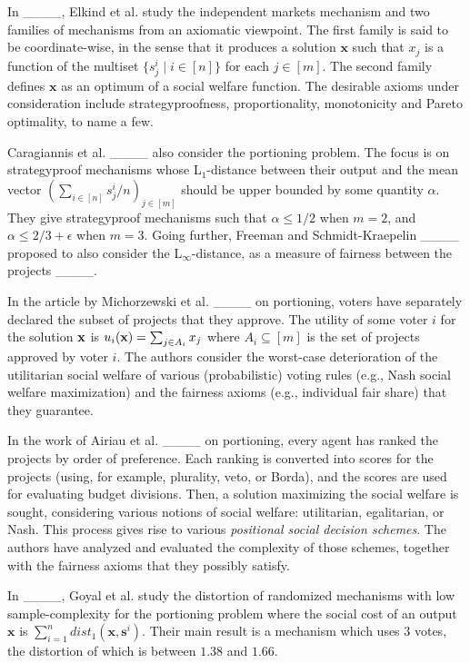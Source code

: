 In ____, Elkind et al. study the independent markets mechanism and two families of mechanisms from an axiomatic viewpoint. The first family is said to be coordinate-wise, in the sense that it produces a solution $\textbf{x}$ such that $x_j$ is a function of the multiset $\{s^i_j \mid i \in [n]\}$ for each $j \in [m]$. The second family defines $\textbf{x}$ as an optimum of a social welfare function. The desirable axioms under consideration include strategyproofness, proportionality, monotonicity and Pareto optimality, to name a few.  

Caragiannis et al. ____ also consider the portioning problem. The focus is on strategyproof mechanisms whose L$_1$-distance between their output and the mean vector $(\sum_{i\in [n]}s^i_j/n)_{j \in [m]}$ should be upper bounded by some quantity $\alpha$. They give strategyproof mechanisms such that $\alpha \leq 1/2$ when $m=2$, and $\alpha \leq 2/3+\epsilon$ when $m=3$. Going further, Freeman and Schmidt{-}Kraepelin ____ proposed to also consider the L$_\infty$-distance, as a measure of fairness between the projects ____.


In the article by Michorzewski et al. ____ on portioning, 
voters have separately declared the subset of projects that they approve. The utility of some voter $i$ for the solution ${\bf x}$ is $u_i({\bf x})=\sum_{j\in A_i} x_j$ where $A_i \subseteq [m]$ is the set of projects approved by voter $i$. The authors consider the worst-case deterioration of the utilitarian social welfare of various (probabilistic) voting rules (e.g., Nash social welfare maximization) and the fairness axioms (e.g., individual fair share) that they guarantee. 



In the work of Airiau et al. ____ on portioning, every agent  has ranked the projects by order of preference. Each ranking is converted into scores for the projects (using, for example, plurality, veto, or Borda), and the scores are used for evaluating budget divisions. Then, a solution maximizing the social welfare is sought, considering  various notions of social welfare: utilitarian, egalitarian, or Nash. This process gives rise to various {\em positional social decision schemes}. The authors have analyzed and evaluated the %
complexity of those schemes, together with the fairness axioms that they possibly satisfy. %

In ____, Goyal et al. study the distortion of randomized mechanisms with low sample-complexity 
for the portioning problem where the social cost of an output $\textbf{x}$ is $\sum_{i=1}^n dist_1(\textbf{x},\textbf{s}^i)$. Their main result is a mechanism which uses 3 votes, the distortion of which is between $1.38$ and $1.66$.    



